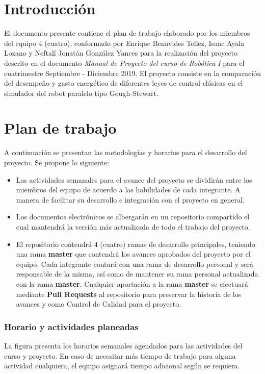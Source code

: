 \section{Introducción}

El documento presente contiene el plan de trabajo elaborado por
los miembros del equipo 4 (cuatro), conformado por 
Enrique Benavides Tellez, Isaac Ayala Lozano y 
Neftalí Jonatán González Yances para la realización del proyecto 
descrito en el documento \emph{Manual de Proyecto del 
curso de Robótica I} para
el cuatrimestre Septiembre - Diciembre 2019. 
El proyecto consiste en la comparación del desempeño y gasto energético de
diferentes leyes de control clásicas en el simulador del robot
paralelo tipo Gough-Stewart. 

\section{Plan de trabajo}

A continuación se presentan las metodologías y horarios para el desarrollo del 
proyecto. Se propone lo siguiente:

\begin{itemize}
 \item Las actividades semanales para el avance del proyecto se dividirán entre 
los miembros del equipo de acuerdo a las habilidades de cada integrante. A 
manera de facilitar su desarrollo e integración con el proyecto en general.
\item Los documentos electrónicos se albergarán en un repositorio compartido el 
cual mantendrá la versión más actualizada de todo el trabajo del proyecto.
\item El repositorio contendrá 4 (cuatro) ramas de desarrollo principales, 
teniendo una rama \textbf{master} que contendrá los avances aprobados del 
proyecto por el equipo.
\subitem Cada integrante contará con una rama de desarrollo personal y será 
responsable de la misma, así como de mantener su rama personal actualizada con 
la rama \textbf{master}.
\subitem Cualquier aportación a la rama \textbf{master} se efectuará mediante 
\textbf{Pull Requests} al repositorio para preservar la historia de los avances 
y como Control de Calidad para el proyecto.

\end{itemize}

\subsubsection{Horario y actividades planeadas}

La figura
presenta los horarios semanales agendados 
para las actividades del curso y proyecto. En caso de necesitar más tiempo de 
trabajo para alguna actividad cualquiera, el equipo asignará tiempo adicional 
según se requiera.


